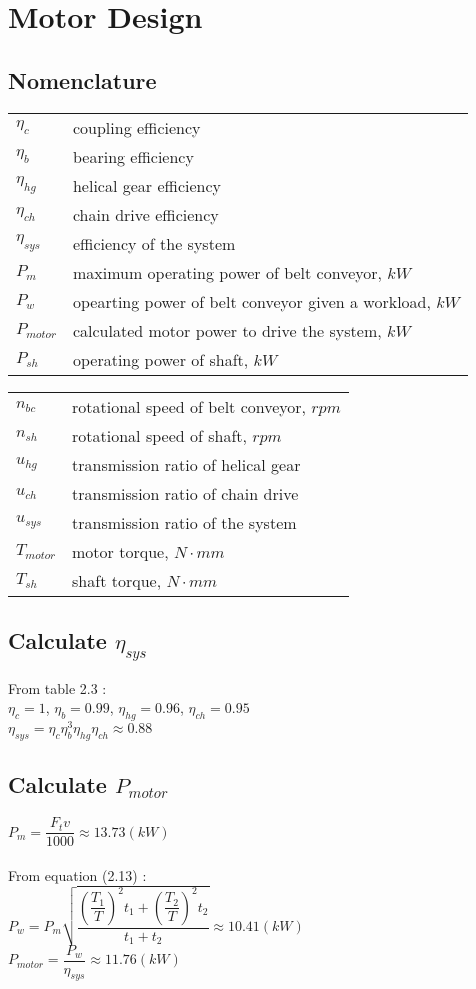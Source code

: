 \chapter{Motor Design}
\section{Nomenclature}
\begin{tabular}[t]{lp{7cm}}
	$ \eta_c $ & coupling efficiency\\
	$ \eta_b $ & bearing efficiency\\
	$ \eta_{hg} $ & helical gear efficiency\\
	$ \eta_{ch} $ & chain drive efficiency\\
	$ \eta_{sys} $ & efficiency of the system\\
	$ P_m $ & maximum operating power of belt conveyor, $ \unit{kW} $\\
	$ P_w $ & opearting power of belt conveyor given a workload, $ \unit{kW} $\\
	$ P_{motor} $ & calculated motor power to drive the system, $ \unit{kW} $\\
	$ P_{sh} $ & operating power of shaft, $ \unit{kW} $\\
\end{tabular}
\begin{tabular}[t]{lp{7cm}}
	$ n_{bc} $ & rotational speed of belt conveyor, $ \unit{rpm} $\\
	$ n_{sh} $ & rotational speed of shaft, $ \unit{rpm} $\\
	$ u_{hg} $ & transmission ratio of helical gear\\
	$ u_{ch} $ & transmission ratio of chain drive\\
	$ u_{sys} $ & transmission ratio of the system\\
	$ T_{motor} $ & motor torque, $ \unit{N\cdot mm} $\\
	$ T_{sh} $ & shaft torque, $ \unit{N\cdot mm} $
\end{tabular}

\section{Calculate $ \eta_{sys} $}
From table 2.3 :\\
$ \eta_c = 1 $, $ \eta_b = 0.99 $, $ \eta_{hg} = 0.96 $, $ \eta_{ch} = 0.95 $\\
$ \eta_{sys} = \eta_c\eta_b^3\eta_{hg}\eta_{ch} \approx 0.88 $

\section{Calculate $ P_{motor} $}
$ P_m = \dfrac{F_tv}{1000} \approx 13.73 \unit{(kW)}$\\\\
From equation (2.13) :\\
$ P_w = P_m\sqrt{\dfrac{\left(\dfrac{T_1}{T}\right)^2t_1 + \left(\dfrac{T_2}{T}\right)^2t_2}{t_1+t_2}} \approx 10.41 \unit{(kW)} $\\
$ P_{motor} = \dfrac{P_w}{\eta_{sys}} \approx 11.76\unit{(kW)}$

